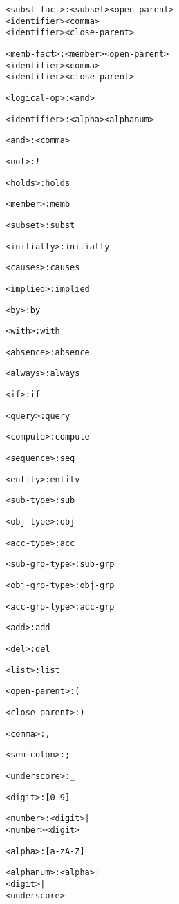 \documentclass[11pt]{report}
\newenvironment{vverbatim}
{
  \begin{alltt}
}
{
    \vspace{-\baselineskip}
  \end{alltt}
}
\begin{document}
\begin{vverbatim}
<subst-fact>             : <subset> <open-parent>
                           <identifier> <comma>
                           <identifier> <close-parent>

<memb-fact>              : <member> <open-parent>
                           <identifier> <comma>
                           <identifier> <close-parent>

<logical-op>             : <and>

<identifier>             : <alpha> <alphanum>

<and>                    : <comma>

<not>                    : !

<holds>                  : holds

<member>                 : memb

<subset>                 : subst

<initially>              : initially

<causes>                 : causes

<implied>                : implied

<by>                     : by

<with>                   : with

<absence>                : absence

<always>                 : always

<if>                     : if

<query>                  : query

<compute>                : compute

<sequence>               : seq

<entity>                 : entity

<sub-type>               : sub

<obj-type>               : obj

<acc-type>               : acc

<sub-grp-type>           : sub-grp

<obj-grp-type>           : obj-grp

<acc-grp-type>           : acc-grp

<add>                    : add

<del>                    : del

<list>                   : list

<open-parent>            : (

<close-parent>           : )

<comma>                  : ,

<semicolon>              : ;

<underscore>             : _

<digit>                  : [0-9]

<number>                 : <digit> |
                           <number> <digit>

<alpha>                  : [a-zA-Z]

<alphanum>               : <alpha> |
                           <digit> |
                           <underscore>
      \end{vverbatim}
\end{document}
